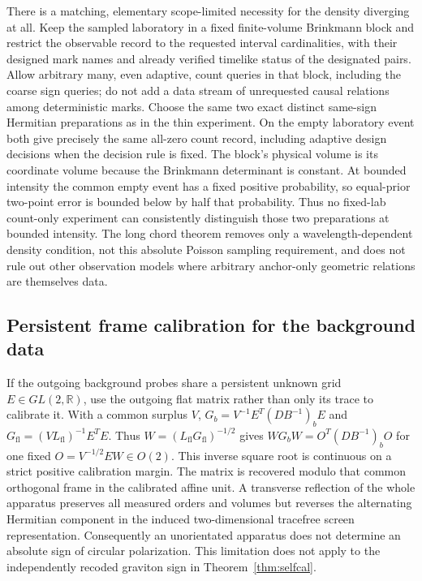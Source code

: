 \documentclass[11pt]{article}
\begin{document}
There is a matching, elementary scope-limited necessity for the density diverging at all. Keep the sampled laboratory in a fixed finite-volume Brinkmann block and restrict the observable record to the requested interval cardinalities, with their designed mark names and already verified timelike status of the designated pairs. Allow arbitrary many, even adaptive, count queries in that block, including the coarse sign queries; do not add a data stream of unrequested causal relations among deterministic marks. Choose the same two exact distinct same-sign Hermitian preparations as in the thin experiment. On the empty laboratory event both give precisely the same all-zero count record, including adaptive design decisions when the decision rule is fixed. The block's physical volume is its coordinate volume because the Brinkmann determinant is constant. At bounded intensity the common empty event has a fixed positive probability, so equal-prior two-point error is bounded below by half that probability. Thus no fixed-lab count-only experiment can consistently distinguish those two preparations at bounded intensity. The long chord theorem removes only a wavelength-dependent density condition, not this absolute Poisson sampling requirement, and does not rule out other observation models where arbitrary anchor-only geometric relations are themselves data.

\subsection{Persistent frame calibration for the background data}
If the outgoing background probes share a persistent unknown grid
\(E\in GL(2,\mathbb R)\), use the outgoing flat matrix rather than
only its trace to calibrate it. With a common surplus \(V\),
\(G_b=V^{-1}E^T(DB^{-1})_bE\) and
\(G_{\mathrm{fl}}=(VL_{\mathrm{fl}})^{-1}E^TE\). Thus
\(W=(L_{\mathrm{fl}}G_{\mathrm{fl}})^{-1/2}\) gives
\(WG_bW=O^T(DB^{-1})_bO\) for one fixed \(O=V^{-1/2}EW\in O(2)\).
This inverse square root is continuous on a strict positive
calibration margin. The matrix is recovered modulo that common
orthogonal frame in the calibrated affine unit. A transverse
reflection of the whole apparatus preserves all measured orders
and volumes but reverses the alternating Hermitian component in the
induced two-dimensional tracefree screen representation.
Consequently an unorientated apparatus does not determine an
absolute sign of circular polarization. This limitation does not
apply to the independently recoded graviton sign in
Theorem~\ref{thm:selfcal}.
\end{document}
